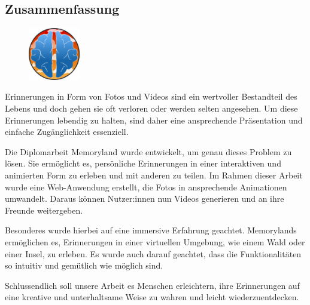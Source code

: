 \newpage
\begin{spacing}{1}
    \chapter*{Zusammenfassung}
\end{spacing}
\begin{figure}
    \begin{center}
      \includegraphics[width=0.2\textwidth]{pics/memoryland-logo.png}
    \end{center}
\end{figure}
Erinnerungen in Form von Fotos und Videos sind ein wertvoller Bestandteil des Lebens und doch
gehen sie oft verloren oder werden selten angesehen. Um diese Erinnerungen lebendig zu halten,
sind daher eine ansprechende Präsentation und einfache Zugänglichkeit essenziell.

Die Diplomarbeit Memoryland wurde entwickelt, um genau dieses Problem zu lösen. Sie ermöglicht es, 
persönliche Erinnerungen in einer interaktiven und animierten Form zu erleben und mit anderen zu 
teilen. Im Rahmen dieser Arbeit wurde eine Web-Anwendung erstellt, die Fotos in ansprechende 
Animationen umwandelt. Daraus können Nutzer:innen nun Videos generieren und an ihre Freunde 
weitergeben.

Besonderes wurde hierbei auf eine immersive Erfahrung geachtet. Memorylands ermöglichen es, 
Erinnerungen in einer virtuellen Umgebung, wie einem Wald oder einer Insel, zu erleben. Es
wurde auch darauf geachtet, dass die Funktionalitäten so intuitiv und gemütlich wie möglich
sind.

Schlussendlich soll unsere Arbeit es Menschen erleichtern, ihre Erinnerungen auf eine 
kreative und unterhaltsame Weise zu wahren und leicht wiederzuentdecken.

